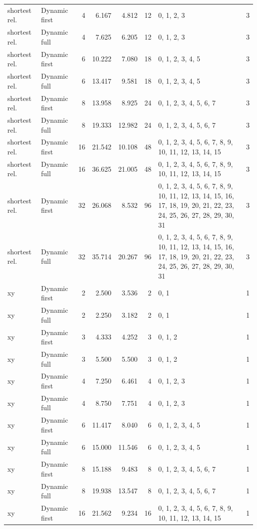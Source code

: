 \documentclass[10pt,a4paper]{article}
\begin{document}
\begin{longtable}{@{}p{23mm}p{29mm}rrrrp{36mm}r@{}}
shortest rel. & Dynamic first & 4 & 6.167 & 4.812 & 12 & 0, 1, 2, 3 & 3 \\
shortest rel. & Dynamic full & 4 & 7.625 & 6.205 & 12 & 0, 1, 2, 3 & 3 \\
shortest rel. & Dynamic first & 6 & 10.222 & 7.080 & 18 & 0, 1, 2, 3, 4, 5 & 3 \\
shortest rel. & Dynamic full & 6 & 13.417 & 9.581 & 18 & 0, 1, 2, 3, 4, 5 & 3 \\
shortest rel. & Dynamic first & 8 & 13.958 & 8.925 & 24 & 0, 1, 2, 3, 4, 5, 6, 7 & 3 \\
shortest rel. & Dynamic full & 8 & 19.333 & 12.982 & 24 & 0, 1, 2, 3, 4, 5, 6, 7 & 3 \\
shortest rel. & Dynamic first & 16 & 21.542 & 10.108 & 48 & 0, 1, 2, 3, 4, 5, 6, 7, 8, 9, 10, 11, 12, 13, 14, 15 & 3 \\
shortest rel. & Dynamic full & 16 & 36.625 & 21.005 & 48 & 0, 1, 2, 3, 4, 5, 6, 7, 8, 9, 10, 11, 12, 13, 14, 15 & 3 \\
shortest rel. & Dynamic first & 32 & 26.068 & 8.532 & 96 & 0, 1, 2, 3, 4, 5, 6, 7, 8, 9, 10, 11, 12, 13, 14, 15, 16, 17, 18, 19, 20, 21, 22, 23, 24, 25, 26, 27, 28, 29, 30, 31 & 3 \\
shortest rel. & Dynamic full & 32 & 35.714 & 20.267 & 96 & 0, 1, 2, 3, 4, 5, 6, 7, 8, 9, 10, 11, 12, 13, 14, 15, 16, 17, 18, 19, 20, 21, 22, 23, 24, 25, 26, 27, 28, 29, 30, 31 & 3 \\
xy & Dynamic first & 2 & 2.500 & 3.536 & 2 & 0, 1 & 1 \\
xy & Dynamic full & 2 & 2.250 & 3.182 & 2 & 0, 1 & 1 \\
xy & Dynamic first & 3 & 4.333 & 4.252 & 3 & 0, 1, 2 & 1 \\
xy & Dynamic full & 3 & 5.500 & 5.500 & 3 & 0, 1, 2 & 1 \\
xy & Dynamic first & 4 & 7.250 & 6.461 & 4 & 0, 1, 2, 3 & 1 \\
xy & Dynamic full & 4 & 8.750 & 7.751 & 4 & 0, 1, 2, 3 & 1 \\
xy & Dynamic first & 6 & 11.417 & 8.040 & 6 & 0, 1, 2, 3, 4, 5 & 1 \\
xy & Dynamic full & 6 & 15.000 & 11.546 & 6 & 0, 1, 2, 3, 4, 5 & 1 \\
xy & Dynamic first & 8 & 15.188 & 9.483 & 8 & 0, 1, 2, 3, 4, 5, 6, 7 & 1 \\
xy & Dynamic full & 8 & 19.938 & 13.547 & 8 & 0, 1, 2, 3, 4, 5, 6, 7 & 1 \\
xy & Dynamic first & 16 & 21.562 & 9.234 & 16 & 0, 1, 2, 3, 4, 5, 6, 7, 8, 9, 10, 11, 12, 13, 14, 15 & 1 \\

\end{longtable}
\end{document}
